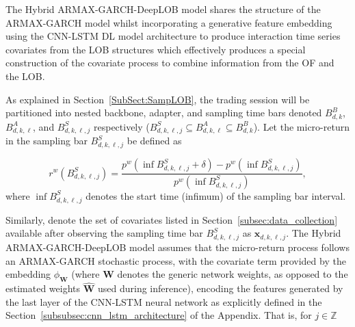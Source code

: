\documentclass{rQUF2e}
\newcommand{\Z}{\mathbb{Z}}
\theoremstyle{plain}
\theoremstyle{definition}
\theoremstyle{remark}
\begin{document}
The Hybrid ARMAX-GARCH-DeepLOB model shares the structure of the ARMAX-GARCH model whilst incorporating a generative feature embedding using the CNN-LSTM DL model architecture to produce interaction time series covariates from the LOB structures which effectively produces a special construction of the covariate process to combine information from the OF and the LOB.

As explained in Section~\ref{SubSect:SampLOB}, the trading session will be partitioned into nested backbone, adapter, and sampling time bars denoted $B^B_{d,k}$, $B^A_{d,k,\ell}$, and $B^S_{d,k,\ell,j}$ respectively ($B^S_{d,k,\ell,j} \subseteq B^A_{d,k,\ell} \subseteq B^B_{d,k}$). Let the micro-return in the sampling bar $B^S_{d, k, \ell, j}$ be defined as

$$
    r^w\left( B^S_{d, k, \ell, j} \right) = \frac{p^w\left( \inf B^S_{d, k, \ell, j} + \delta \right) - p^w\left( \inf B^S_{d, k, \ell, j}\right)}{p^w\left( \inf B^S_{d, k, \ell, j}\right)},
$$
where $\inf B^S_{d, k, \ell, j}$ denotes the start time (infimum) of the sampling bar interval.

Similarly, denote the set of covariates listed in Section~\ref{subsec:data_collection} available after observing the sampling time bar $B^S_{d, k, \ell, j}$ as $\mathbf{x}_{d, k, \ell, j}$. The Hybrid ARMAX-GARCH-DeepLOB model assumes that the micro-return process follows an ARMAX-GARCH stochastic process, with the covariate term provided by the embedding $\phi_{\mathbf{W}}$ (where $\mathbf{W}$ denotes the generic network weights, as opposed to the estimated weights $\hat{\mathbf{W}}$ used during inference), encoding the features generated by the last layer of the CNN-LSTM neural network as explicitly defined in the Section~\ref{subsubsec:cnn_lstm_architecture} of the Appendix. That is, for $j \in \Z$
\end{document}
